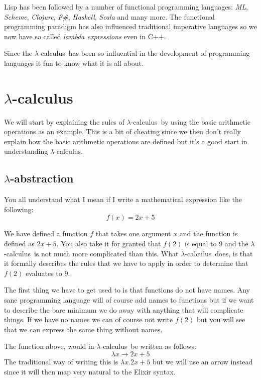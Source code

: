 \documentclass[a4paper,11pt]{article}
\newcommand{\lamc}[0]{$\lambda$-calculus}
\newcommand{\lama}[0]{$\lambda$-abstraction}
\begin{document}
Lisp has been followed by a number of functional
programming languages: {\em ML}, {\em Scheme}, {\em Clojure}, {\em
  F\#}, {\em Haskell}, {\em Scala} and many more. The functional
programming paradigm has also influenced traditional imperative
languages so we now have so called {\em lambda expressions} even in C++.

Since the \lamc\ has been so influential in the development of
programming languages it fun to know what it is all about. 



\section{\lamc}

We will start by explaining the rules of \lamc\ by using the basic
arithmetic operations as an example. This is a bit of cheating since we
then don't really explain how the basic arithmetic operations are
defined but it's a good start in understanding \lamc.


\subsection{\lama}

You all understand what I mean if I write a mathematical expression
like the following:$$f(x) = 2x + 5$$

We have defined a function $f$ that takes one argument $x$ and the
function is defined as $2x + 5$. You also take it for granted that
$f(2)$ is equal to $9$ and the \lamc\ is not much more complicated
than this. What \lamc\ does, is that it formally describes the rules
that we have to apply in order to determine that $f(2)$ evaluates to
$9$.

The first thing we have to get used to is that functions do not have
names. Any sane programming language will of course add names to
functions but if we want to describe the bare minimum we do away with
anything that will complicate things. If we have no names we can of
course not write $f(2)$ but you will see that we can express the same
thing without names.

The function above, would in \lamc\ be written as
follows:$$\lambda x \rightarrow 2x + 5$$The traditional way of writing
this is $\lambda x.2x+5$ but we will use an arrow instead since it
will then map very natural to the Elixir syntax.
\end{document}
